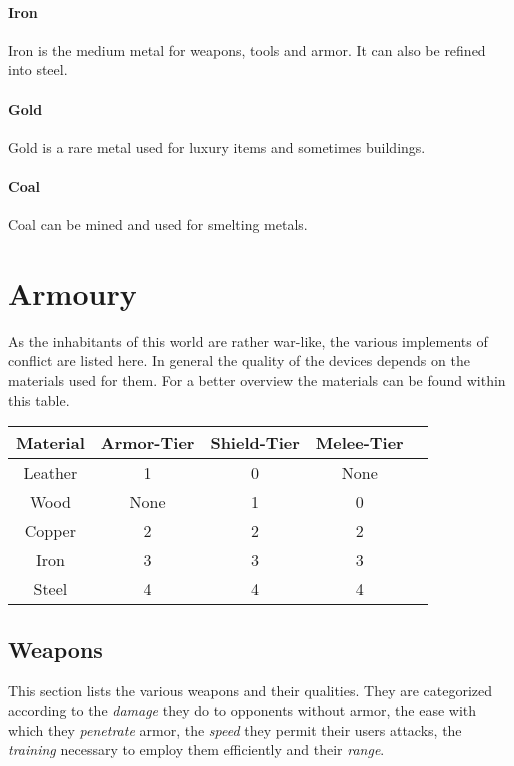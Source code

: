 \documentclass[a4paper]{book}
\begin{document}
\paragraph{Iron}
Iron is the medium metal for weapons, tools and armor. It can also be refined
into steel.

\paragraph{Gold}
Gold is a rare metal used for luxury items and sometimes buildings.

\paragraph{Coal}
Coal can be mined and used for smelting metals.

\section{Armoury}
As the inhabitants of this world are rather war-like, the various implements of
conflict are listed here. In general the quality of the devices depends on the
materials used for them. For a better overview the materials can be found
within this table.

\begin{longtable}{ccccc}
	\toprule
	Material & Armor-Tier & Shield-Tier & Melee-Tier \\
	\midrule
	Leather  & 1          & 0           & None       \\
	Wood     & None       & 1           & 0          \\
	Copper   & 2          & 2           & 2          \\
	Iron     & 3          & 3           & 3          \\
	Steel    & 4          & 4           & 4          \\
	\bottomrule
\end{longtable}

\subsection{Weapons}
This section lists the various weapons and their qualities. They are
categorized according to the \emph{damage} they do to opponents without armor,
the ease with which they \emph{penetrate} armor, the \emph{speed} they permit
their users attacks, the \emph{training} necessary to employ them efficiently
and their \emph{range}.
\end{document}
